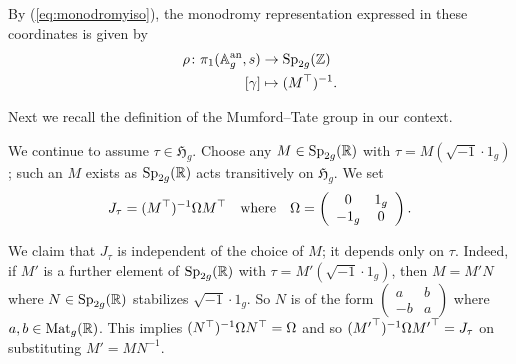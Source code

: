 \documentclass[12pt,oneside]{amsart}
\begin{document}
By (\ref{eq:monodromyiso}), the monodromy representation 
expressed in these coordinates is given by
\begin{equation}
  \label{eq:monodromyrep}
  \begin{aligned}
    \rho \colon \pi_1({\mathbb{A}}_g^{\mathrm{an}},s)&\rightarrow   \mathrm{Sp}_{2g}({\mathbb{Z}})\\
    [\gamma]&\mapsto (M^\top)^{-1}.
  \end{aligned}
\end{equation}




Next we recall the definition of the Mumford--Tate group in our context.


We continue to assume $\tau\in\mathfrak{H}_g$.
Choose any $M \in \mathrm{Sp}_{2g}({\mathbb{R}})$
with $\tau = M(\sqrt{-1}\cdot 1_g)$; such an $M$ exists as
$\mathrm{Sp}_{2g}({\mathbb{R}})$ acts transitively on $\mathfrak{H}_g$. We set
\begin{equation}
  \label{eq:formulaJ}
  J_\tau = (M^{\top})^{-1} \Omega
  M^{\top}\quad\text{where}\quad \Omega=\left(
    \begin{array}{cc}
      0 & 1_g \\ -1_g & 0
    \end{array}\right). 
\end{equation}

We claim that $J_\tau$ is independent
of the choice of $M$; it depends only on $\tau$. Indeed,
if $M'$ is a further element of $\mathrm{Sp}_{2g}({\mathbb{R}})$ with $\tau =
M' (\sqrt{-1} \cdot 1_g)$, then $M = M' N$ where $N\in
\mathrm{Sp}_{2g}({\mathbb{R}})$ stabilizes $\sqrt{-1}\cdot 1_g$. So $N$ is of
the form $\left(
  \begin{array}{cc} a & b \\ -b & a
  \end{array}\right)$ where $a,b\in {\rm Mat}_{g}({{\mathbb{R}}})$. This implies
$(N^\top)^{-1} \Omega N^\top = \Omega$ and so $({M'}^\top)^{-1} \Omega
{M'}^\top=J_\tau$ on substituting $M'=MN^{-1}$. 
\end{document}
